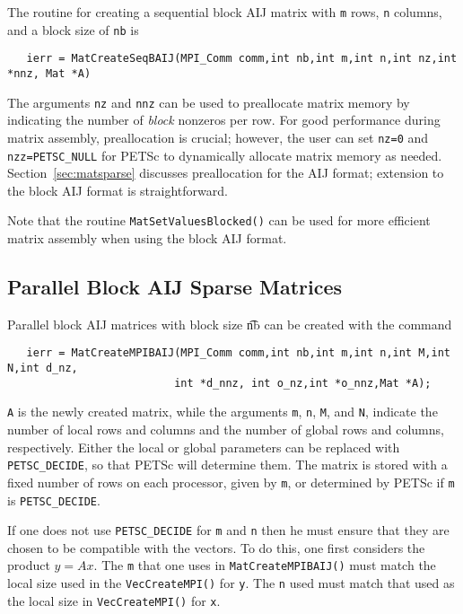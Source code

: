 The routine for creating a sequential block AIJ matrix with {\tt m} 
rows, {\tt n} columns, and a block size of {\tt nb} is
\begin{verbatim}
   ierr = MatCreateSeqBAIJ(MPI_Comm comm,int nb,int m,int n,int nz,int *nnz, Mat *A)
\end{verbatim}
The arguments {\tt nz} and {\tt nnz} can be used to preallocate matrix
memory by indicating the number of {\em block} nonzeros per row.  For good
performance during matrix assembly, preallocation is crucial; however, the
user can set {\tt nz=0} and {\tt nzz=PETSC\_NULL} for PETSc to dynamically
allocate matrix memory as needed.  Section~\ref{sec:matsparse}
discusses preallocation for the AIJ format; extension to the block AIJ
format is straightforward.

Note that the routine {\tt MatSetValuesBlocked()}
 can be used for more efficient matrix assembly
when using the block AIJ format.

\subsection{Parallel Block AIJ Sparse Matrices}

Parallel block AIJ matrices with block size {\t nb} can be created with
the command 
\begin{verbatim}
   ierr = MatCreateMPIBAIJ(MPI_Comm comm,int nb,int m,int n,int M,int N,int d_nz,
                          int *d_nnz, int o_nz,int *o_nnz,Mat *A);
\end{verbatim}
{\tt A} is the newly created matrix, while the arguments {\tt m}, {\tt n}, 
{\tt M}, and {\tt N}, indicate the number of local rows and columns and
the number of global rows and columns, respectively. Either the local or
global parameters can be replaced with {\tt PETSC\_DECIDE}, so that 
PETSc will determine  them.
The matrix is stored with a fixed number of rows on 
each processor, given by {\tt m}, or determined by PETSc if {\tt m} is
{\tt PETSC\_DECIDE}.

If one does not use {\tt PETSC\_DECIDE} for
{\tt m} and {\tt n} then he must ensure that they are chosen to be
compatible with the vectors. To do this, one first considers the product 
$y = A x$. The {\tt m} that one uses in {\tt MatCreateMPIBAIJ()}
must match the local size used in the {\tt VecCreateMPI()} for {\tt y}.
The {\tt n} used must match that used as the local size in 
{\tt VecCreateMPI()} for {\tt x}. 

